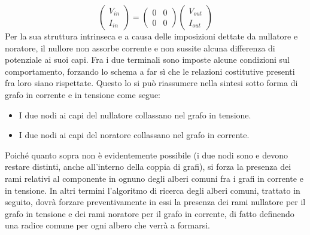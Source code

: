 $$
\left(
 \begin{array}{c}
  V_{in} \\ I_{in}
 \end{array}
\right)
=
\left(
 \begin{array}{cc}
  0 & 0 \\ 0 & 0
 \end{array}
\right)
\left(
 \begin{array}{c}
  V_{out} \\ I_{out}
 \end{array}
\right)
$$
Per la sua struttura intrinseca e a causa delle imposizioni dettate da nullatore e noratore, il nullore non assorbe corrente e non sussite alcuna differenza di potenziale ai suoi capi. Fra i due terminali sono imposte alcune condizioni sul comportamento, forzando lo schema a far sì che le relazioni costitutive presenti fra loro siano rispettate. Questo lo si può riassumere nella sintesi sotto forma di grafo in corrente e in tensione come segue:
\begin{itemize}
 \item I due nodi ai capi del nullatore collassano nel grafo in tensione.
 \item I due nodi ai capi del noratore collassano nel grafo in corrente.
\end{itemize}
Poiché quanto sopra non è evidentemente possibile (i due nodi sono e devono restare distinti, anche all'interno della coppia di grafi), si forza la presenza dei rami relativi al componente in ognuno degli alberi comuni fra i grafi in corrente e in tensione. In altri termini l'algoritmo di ricerca degli alberi comuni, trattato in seguito, dovrà forzare preventivamente in essi la presenza dei rami nullatore per il grafo in tensione e dei rami noratore per il grafo in corrente, di fatto definendo una radice comune per ogni albero che verrà a formarsi. 

